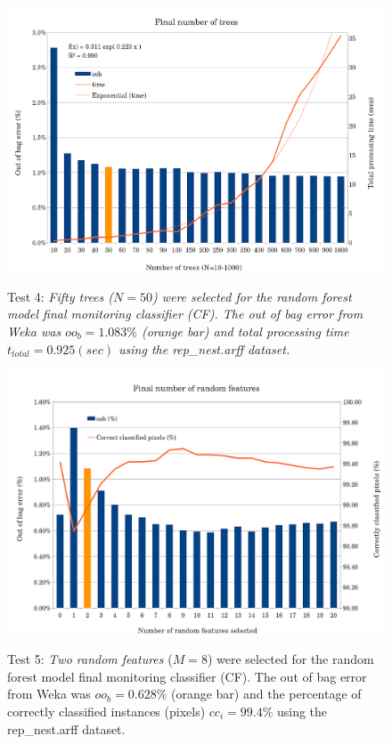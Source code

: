 \begin{figure}\myfloatalign
\includegraphics[width=0.9\linewidth]{gfx6/models/number-of-trees} \\
\caption[Number of trees.]{Test 4: \emph{Fifty trees ($ N = 50 $) were selected for the random forest model final monitoring classifier (CF). The out of bag error from Weka was $oo_b= 1.083\%$ (orange bar) and total processing time $ t_{total} = 0.925(sec)$ using the rep\_nest.arff dataset.}}\label{fig:trees}
\end{figure}

\begin{figure}\myfloatalign
\includegraphics[width=0.9\linewidth]{gfx6/models/random-features} \\
\caption[Number of random features.]{Test 5: \emph{Two random features} ($ M = 8 $) were selected for the random forest model final monitoring classifier (CF). The out of bag error from Weka was $oo_b = 0.628\%$ (orange bar) and the percentage of correctly classified instances (pixels) $cc_{i} = 99.4\%$ using the rep\_nest.arff dataset.}\label{fig:random-features}
\end{figure}


